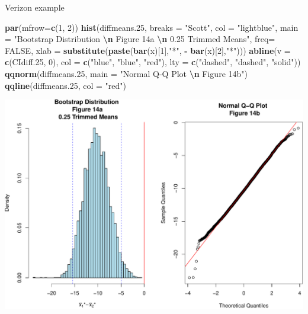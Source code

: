 \documentclass[
  ignorenonframetext,
]{beamer}
\newenvironment{Shaded}{\begin{snugshade}}{\end{snugshade}}
\newcommand{\AttributeTok}[1]{\textcolor[rgb]{0.13,0.29,0.53}{#1}}
\newcommand{\ConstantTok}[1]{\textcolor[rgb]{0.56,0.35,0.01}{#1}}
\newcommand{\DecValTok}[1]{\textcolor[rgb]{0.00,0.00,0.81}{#1}}
\newcommand{\FloatTok}[1]{\textcolor[rgb]{0.00,0.00,0.81}{#1}}
\newcommand{\FunctionTok}[1]{\textcolor[rgb]{0.13,0.29,0.53}{\textbf{#1}}}
\newcommand{\NormalTok}[1]{#1}
\newcommand{\SpecialCharTok}[1]{\textcolor[rgb]{0.81,0.36,0.00}{\textbf{#1}}}
\newcommand{\StringTok}[1]{\textcolor[rgb]{0.31,0.60,0.02}{#1}}
\begin{document}
\begin{frame}[fragile]{Verizon example}
\protect\hypertarget{verizon-example-10}{}
\tiny

\begin{Shaded}
\begin{Highlighting}[]
\FunctionTok{par}\NormalTok{(}\AttributeTok{mfrow=}\FunctionTok{c}\NormalTok{(}\DecValTok{1}\NormalTok{, }\DecValTok{2}\NormalTok{))}
\FunctionTok{hist}\NormalTok{(diffmeans}\FloatTok{.25}\NormalTok{, }\AttributeTok{breaks =} \StringTok{"Scott"}\NormalTok{, }\AttributeTok{col =} \StringTok{"lightblue"}\NormalTok{, }
     \AttributeTok{main =} \StringTok{"Bootstrap Distribution }\SpecialCharTok{\textbackslash{}n}\StringTok{ Figure 14a }\SpecialCharTok{\textbackslash{}n}\StringTok{ 0.25 Trimmed Means"}\NormalTok{, }
     \AttributeTok{freq=} \ConstantTok{FALSE}\NormalTok{, }\AttributeTok{xlab =} \FunctionTok{substitute}\NormalTok{(}\FunctionTok{paste}\NormalTok{(}\FunctionTok{bar}\NormalTok{(x)[}\DecValTok{1}\NormalTok{],}\StringTok{"*"}\NormalTok{, }\SpecialCharTok{{-}} \FunctionTok{bar}\NormalTok{(x)[}\DecValTok{2}\NormalTok{],}\StringTok{"*"}\NormalTok{)))}
\FunctionTok{abline}\NormalTok{(}\AttributeTok{v =} \FunctionTok{c}\NormalTok{(CIdiff}\FloatTok{.25}\NormalTok{, }\DecValTok{0}\NormalTok{), }\AttributeTok{col =} \FunctionTok{c}\NormalTok{(}\StringTok{"blue"}\NormalTok{, }\StringTok{"blue"}\NormalTok{, }\StringTok{"red"}\NormalTok{), }
       \AttributeTok{lty =} \FunctionTok{c}\NormalTok{(}\StringTok{"dashed"}\NormalTok{, }\StringTok{"dashed"}\NormalTok{, }\StringTok{"solid"}\NormalTok{))}
\FunctionTok{qqnorm}\NormalTok{(diffmeans}\FloatTok{.25}\NormalTok{, }\AttributeTok{main =} \StringTok{"Normal Q{-}Q Plot }\SpecialCharTok{\textbackslash{}n}\StringTok{ Figure 14b"}\NormalTok{)}
\FunctionTok{qqline}\NormalTok{(diffmeans}\FloatTok{.25}\NormalTok{, }\AttributeTok{col =} \StringTok{"red"}\NormalTok{)}
\end{Highlighting}
\end{Shaded}

\begin{center}\includegraphics[width=0.6\linewidth,height=0.4\textheight]{Week10_Lect_files/figure-beamer/unnamed-chunk-42-1} \end{center}


\end{frame}
\end{document}
